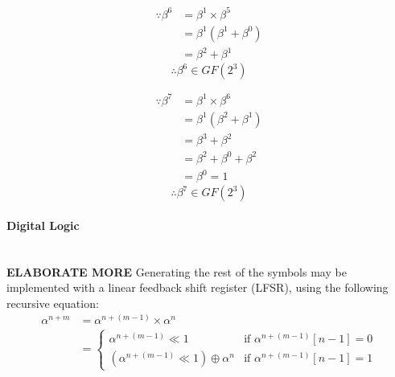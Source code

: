         \begin{minipage}[t]{0.5\textwidth}
            \begin{equation*}
                \begin{split}
                    \because \beta^{6} & = \beta^{1} \times \beta^{5} \\
                    & = \beta^{1} (\beta^{1}+\beta^{0}) \\
                    & = \beta^{2}+\beta^{1}
                \end{split}
            \end{equation*}
            \[ \therefore \beta^{6} \in GF(2^{3}) \]
        \end{minipage}
        \begin{minipage}[t]{0.5\textwidth}
            \begin{equation*}
                \begin{split}
                    \because \beta^{7} & = \beta^{1} \times \beta^{6} \\
                    & = \beta^{1} (\beta^{2}+\beta^{1}) \\
                    & = \beta^{3}+\beta^{2} \\
                    & = \beta^{2}+\beta^{0}+\beta^{2} \\
                    & = \beta^{0} = 1
                \end{split}
            \end{equation*}
            \[ \therefore \beta^{7} \in GF(2^{3}) \]
        \end{minipage}
        \newpage

        \paragraph{Digital Logic} \leavevmode \\ \textbf{ELABORATE MORE}
        Generating the rest of the symbols may be implemented with a linear
        feedback shift register (LFSR), using the following recursive equation:
        \begin{equation*}
            \begin{split}
                \alpha^{n+m} & =\alpha^{n+(m-1)}\times \alpha^{n} \\
                & = \begin{cases}
                        \alpha^{n+(m-1)} \ll 1 &
                        \text{if $\alpha^{n+(m-1)}[n-1] = 0$} \\
                        (\alpha^{n+(m-1)} \ll 1 ) \oplus \alpha^{n} &
                        \text{if $\alpha^{n+(m-1)}[n-1] = 1$}
                    \end{cases}
            \end{split}
        \end{equation*}
